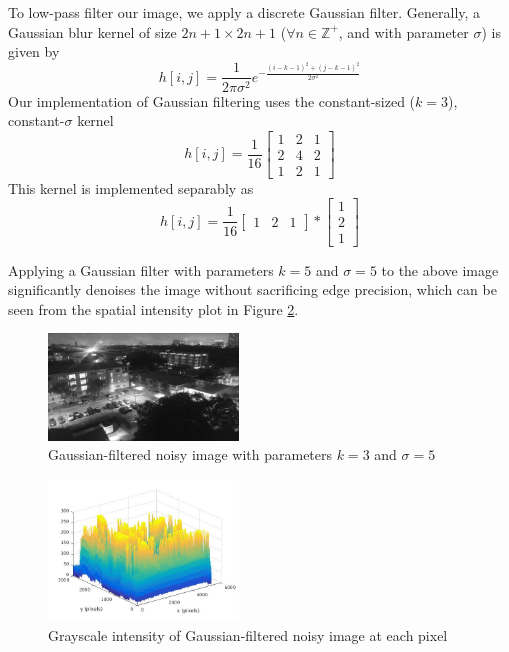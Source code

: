 \documentclass[journal]{IEEEtran}
\begin{document}
To low-pass filter our image, we apply a discrete Gaussian filter. Generally, a Gaussian blur kernel of size $2n + 1 \times 2n + 1$ ($\forall n \in \mathbb{Z}^+$, and with parameter $\sigma$) is given by
$$h[i, j] = \frac{1}{2\pi \sigma^2}e^{-\frac{(i - k - 1)^2 + (j - k - 1)^2}{2\sigma^2}}$$
Our implementation of Gaussian filtering uses the constant-sized ($k = 3$), constant-$\sigma$ kernel
\[
h[i, j] = \frac{1}{16}
\begin{bmatrix}
	1 & 2 & 1 \\
	2 & 4 & 2 \\
	1 & 2 & 1
\end{bmatrix}
\]
This kernel is implemented separably as
\begin{equation}
	\label{gaussian-filter}
	h[i, j] = \frac{1}{16}
	\begin{bmatrix}
		1 & 2 & 1
	\end{bmatrix}
	*
	\begin{bmatrix}
		1 \\ 2 \\ 1
	\end{bmatrix}
\end{equation}
\par Applying a Gaussian filter with parameters $k = 5$ and $\sigma = 5$ to the above image significantly denoises the image without sacrificing edge precision, which can be seen from the spatial intensity plot in Figure \ref{filtered-noisy-image-mesh}.
\begin{figure}[H]
	\centering
	\includegraphics[width=0.45\textwidth]{filtered_noisy_image.jpg}
	\caption{Gaussian-filtered noisy image with parameters $k = 3$ and $\sigma = 5$}
    \label{filtered-noisy-image}
\end{figure}
\begin{figure}[h]
	\centering
	\includegraphics[width=0.45\textwidth]{filtered_noisy_image_mesh.jpg}
	\caption{Grayscale intensity of Gaussian-filtered noisy image at each pixel}
    \label{filtered-noisy-image-mesh}
\end{figure}
\end{document}
